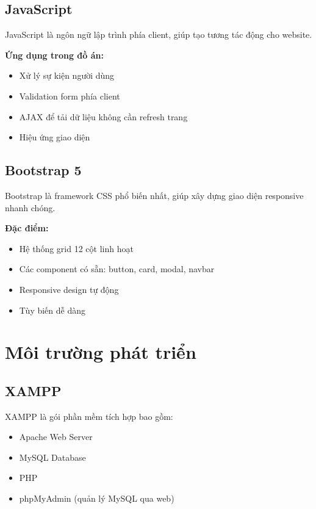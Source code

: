 \documentclass[13pt,a4paper]{extreport}
\begin{document}
\subsection{JavaScript}

JavaScript là ngôn ngữ lập trình phía client, giúp tạo tương tác động cho website.

\textbf{Ứng dụng trong đồ án:}
\begin{itemize}
    \item Xử lý sự kiện người dùng
    \item Validation form phía client
    \item AJAX để tải dữ liệu không cần refresh trang
    \item Hiệu ứng giao diện
\end{itemize}

\subsection{Bootstrap 5}

Bootstrap là framework CSS phổ biến nhất, giúp xây dựng giao diện responsive nhanh chóng.

\textbf{Đặc điểm:}
\begin{itemize}
    \item Hệ thống grid 12 cột linh hoạt
    \item Các component có sẵn: button, card, modal, navbar
    \item Responsive design tự động
    \item Tùy biến dễ dàng
\end{itemize}

\section{Môi trường phát triển}

\subsection{XAMPP}

XAMPP là gói phần mềm tích hợp bao gồm:
\begin{itemize}
    \item Apache Web Server
    \item MySQL Database
    \item PHP
    \item phpMyAdmin (quản lý MySQL qua web)
\end{itemize}
\end{document}
